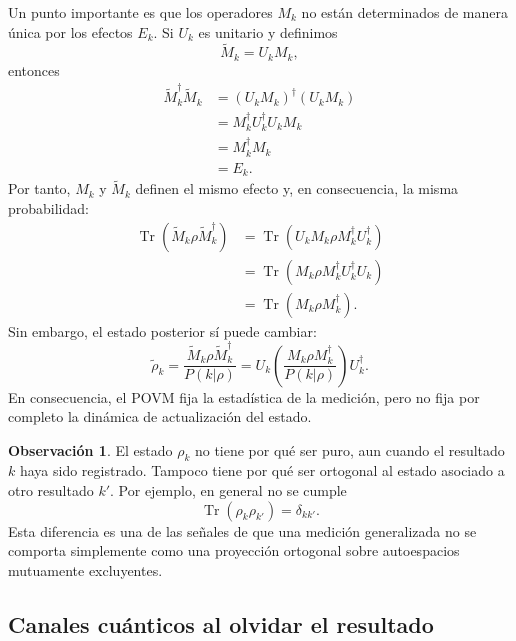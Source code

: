 \documentclass[12pt,a4paper]{article}
\theoremstyle{definition}
\newtheorem{observacion}[definicion]{Observación}
\theoremstyle{plain}
\theoremstyle{remark}
\begin{document}
Un punto importante es que los operadores $M_k$ no están determinados de manera única por los efectos $E_k$. Si $U_k$ es unitario y definimos
\begin{equation*}
    \widetilde M_k=U_kM_k,
\end{equation*}
entonces
\begin{align*}
    \widetilde M_k^\dagger\widetilde M_k
    &=(U_kM_k)^\dagger(U_kM_k)\\
    &=M_k^\dagger U_k^\dagger U_kM_k\\
    &=M_k^\dagger M_k\\
    &=E_k.
\end{align*}
Por tanto, $M_k$ y $\widetilde M_k$ definen el mismo efecto y, en consecuencia, la misma probabilidad:
\begin{align*}
    \operatorname{Tr}(\widetilde M_k\rho\widetilde M_k^\dagger)
    &=\operatorname{Tr}(U_kM_k\rho M_k^\dagger U_k^\dagger)\\
    &=\operatorname{Tr}(M_k\rho M_k^\dagger U_k^\dagger U_k)\\
    &=\operatorname{Tr}(M_k\rho M_k^\dagger).
\end{align*}
Sin embargo, el estado posterior sí puede cambiar:
\begin{equation*}
    \widetilde\rho_k
    =
    \frac{\widetilde M_k\rho\widetilde M_k^\dagger}{P(k|\rho)}
    =
    U_k
    \left(
    \frac{M_k\rho M_k^\dagger}{P(k|\rho)}
    \right)
    U_k^\dagger.
\end{equation*}
En consecuencia, el POVM fija la estadística de la medición, pero no fija por completo la dinámica de actualización del estado.

\begin{observacion}
El estado $\rho_k$ no tiene por qué ser puro, aun cuando el resultado $k$ haya sido registrado. Tampoco tiene por qué ser ortogonal al estado asociado a otro resultado $k'$. Por ejemplo, en general no se cumple
\begin{equation*}
    \operatorname{Tr}(\rho_k\rho_{k'})=\delta_{kk'}.
\end{equation*}
Esta diferencia es una de las señales de que una medición generalizada no se comporta simplemente como una proyección ortogonal sobre autoespacios mutuamente excluyentes.
\end{observacion}

\subsection{Canales cuánticos al olvidar el resultado}
\end{document}
